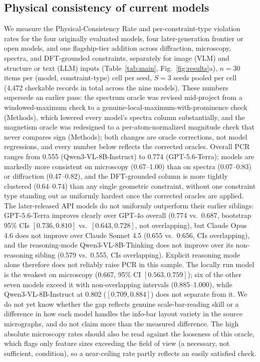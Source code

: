 \documentclass[pdflatex,sn-nature]{sn-jnl}
\begin{document}
\subsection*{Physical consistency of current models}
We measure the Physical-Consistency Rate and per-constraint-type violation rates for
the four originally evaluated models, four later-generation frontier or open models, and
one flagship-tier addition
across diffraction, microscopy, spectra, and
DFT-grounded constraints, separately for image (VLM) and structure or text (LLM)
inputs (Table~\ref{tab:main}, Fig.~\ref{fig:results}a), $n=30$ items per (model, constraint-type) cell per seed, $S=3$ seeds
pooled per cell (4{,}472 checkable records in total across the nine models). These numbers
supersede an earlier pass: the spectrum oracle was revised mid-project from a
windowed-maximum check to a genuine-local-maximum-with-prominence check (Methods), which
lowered every model's spectra column substantially, and the magnetism oracle was
redesigned to a per-atom-normalized magnitude check that never compares sign (Methods);
both changes are oracle corrections, not model regressions, and every number below
reflects the corrected oracles. Overall PCR ranges from 0.555
(Qwen3-VL-8B-Instruct) to 0.774 (GPT-5.6-Terra); models are
markedly more consistent on microscopy (0.67--1.00) than on spectra (0.07--0.83) or
diffraction (0.47--0.82), and the DFT-grounded column is more tightly clustered
(0.64--0.74) than any single geometric constraint, without one constraint type standing
out as uniformly hardest once the corrected oracles are applied. The later-released API models do not uniformly outperform their
earlier siblings: GPT-5.6-Terra improves clearly over GPT-4o
overall (0.774 vs.\ 0.687, bootstrap 95\% CIs $[0.736,0.810]$ vs.\ $[0.643,0.728]$, not
overlapping), but Claude Opus 4.6 does not improve over Claude Sonnet 4.5 (0.655 vs.\
0.656, CIs overlapping), and the reasoning-mode Qwen3-VL-8B-Thinking does not improve over
its non-reasoning sibling (0.579 vs.\ 0.555, CIs overlapping). Explicit reasoning
mode alone therefore does not reliably raise PCR in this sample. The locally run model is the weakest on microscopy
(0.667, 95\% CI $[0.563,0.759]$); six of the other seven models exceed it with
non-overlapping intervals (0.885--1.000), while Qwen3-VL-8B-Instruct at 0.802
($[0.709,0.884]$) does not separate from it. We do not yet know whether the gap
reflects genuine scale-bar-reading skill or a difference in how each model handles the
info-bar layout variety in the source micrographs, and do not claim more than the
measured difference. The high absolute microscopy rates should also be read against the
looseness of this oracle, which flags only feature sizes exceeding the field of view (a
necessary, not sufficient, condition), so a near-ceiling rate partly reflects an easily
satisfied check.
\end{document}
